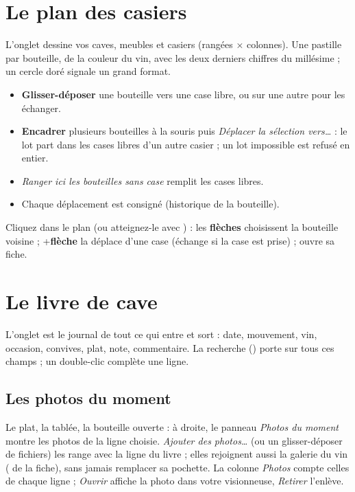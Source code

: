 \documentclass[11pt,a4paper]{article}
\begin{document}

\section{Le plan des casiers}
L'onglet  dessine vos caves, meubles et casiers (rangées × colonnes). Une pastille
par bouteille, de la couleur du vin, avec les deux derniers chiffres du millésime ; un cercle doré signale
un grand format.
\begin{itemize}
  \item \textbf{Glisser-déposer} une bouteille vers une case libre, ou sur une autre pour les échanger.
  \item \textbf{Encadrer} plusieurs bouteilles à la souris puis \emph{Déplacer la sélection vers…} : le lot
        part dans les cases libres d'un autre casier ; un lot impossible est refusé en entier.
  \item \emph{Ranger ici les bouteilles sans case} remplit les cases libres.
  \item Chaque déplacement est consigné (historique de la bouteille).
\end{itemize}


\begin{clavier}
Cliquez dans le plan (ou atteignez-le avec ) : les \textbf{flèches} choisissent la bouteille
voisine ; +\textbf{flèche} la déplace d'une case (échange si la case est prise) ;
 ouvre sa fiche.
\end{clavier}

\section{Le livre de cave}
L'onglet  est le journal de tout ce qui entre et sort : date, mouvement, vin,
occasion, convives, plat, note, commentaire. La recherche () porte sur tous ces champs ; un
double-clic complète une ligne.

\subsection{Les photos du moment}
Le plat, la tablée, la bouteille ouverte : à droite, le panneau \emph{Photos du moment} montre les photos
de la ligne choisie. \emph{Ajouter des photos…} (ou un glisser-déposer de fichiers) les range avec la
ligne du livre ; elles rejoignent aussi la galerie du vin ( de la fiche), sans jamais
remplacer sa pochette. La colonne \emph{Photos} compte celles de chaque ligne ; \emph{Ouvrir} affiche la
photo dans votre visionneuse, \emph{Retirer} l'enlève.
\end{document}

